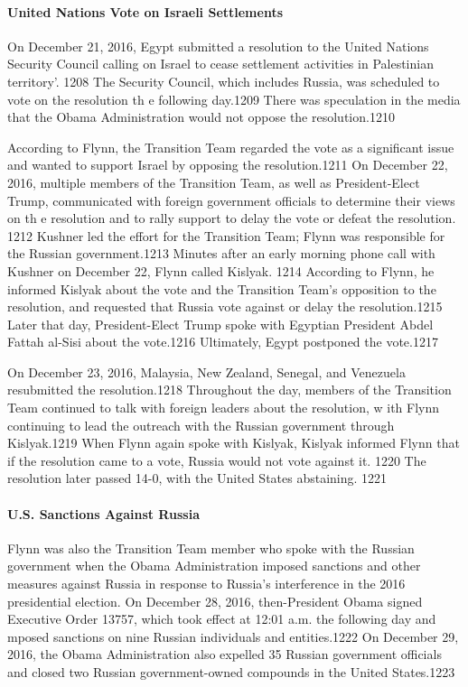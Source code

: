 \paragraph{United Nations Vote on Israeli Settlements}

On December 21,  2016,  Egypt submitted a  resolution to the United Nations Security Council calling on Israel to cease settlement activities in Palestinian territory'. 1208 The Security Council, which includes Russia, was scheduled to vote on the resolution th e  following day.1209 There was speculation in the media that the Obama Administration would not oppose the resolution.1210

According to Flynn, the Transition Team regarded the vote as a  significant issue and wanted to support Israel by opposing the resolution.1211 On December 22, 2016, multiple members of the Transition Team, as well as President-Elect Trump, communicated with foreign government officials to determine their views on th e resolution and to rally support to delay the vote or defeat the resolution. 1212 Kushner led the effort for the Transition Team; Flynn was responsible for the Russian government.1213 Minutes after an early morning phone call with Kushner on December 22, Flynn called Kislyak. 1214 According to Flynn, he informed Kislyak about the vote and the Transition Team's opposition to the resolution, and requested that Russia vote against or delay the resolution.1215 Later that day, President-Elect Trump spoke with Egyptian President Abdel Fattah al-Sisi about the vote.1216 Ultimately, Egypt postponed the vote.1217

On December 23, 2016, Malaysia, New Zealand, Senegal, and Venezuela resubmitted the resolution.1218 Throughout the day, members of the Transition Team continued to talk with foreign leaders about the resolution, w ith Flynn continuing to lead the outreach with the Russian government through Kislyak.1219 When Flynn again spoke with Kislyak, Kislyak informed Flynn that if  the resolution came to a  vote, Russia would not vote against it. 1220 The resolution later passed 14-0, with the United States abstaining. 1221

\paragraph{U.S. Sanctions Against Russia}

Flynn was also the Transition Team member who spoke with the Russian government when the Obama Administration imposed sanctions and other measures against Russia in response to Russia's interference in the 2016 presidential election. On December 28, 2016, then-President Obama signed Executive Order 13757, which took effect at 12:01 a.m. the following day and mposed sanctions on nine Russian individuals and entities.1222 On December 29, 2016, the Obama Administration also expelled 35 Russian government officials and closed two Russian government-owned compounds in the United States.1223

